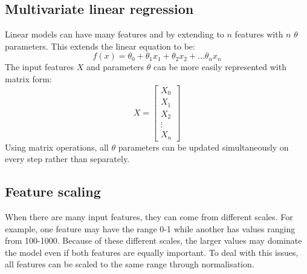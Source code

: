 \documentclass[CS5104-Notes.tex]{subfiles}
\begin{document}
\subsection{Multivariate linear regression}
Linear models can have many features and by extending to $n$ features with $n$ $\theta$ parameters. This extends the linear equation to be:
\begin{equation}
f(x) = \theta_{0} + \theta_{1}x_{1} + \theta_{2}x_{2} + ... \theta_{n}x_{n}
\end{equation}
The input features $X$ and parameters $\theta$ can be more easily represented with matrix form:
\begin{equation}
X = \begin{bmatrix}
X_{0} \\
X_{1} \\
X_{2} \\
\vdots \\
X_{n}
\end{bmatrix}
\end{equation}
Using matrix operations, all $\theta$ parameters can be updated simultaneously on every step rather than separately.

\subsection{Feature scaling}
When there are many input features, they can come from different scales. For example, one feature may have the range 0-1 while another has values ranging from 100-1000. Because of these different scales, the larger values may dominate the model even if both features are equally important. To deal with this issues, all features can be scaled to the same range through normalisation.
\end{document}
